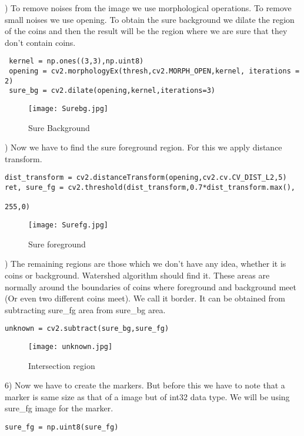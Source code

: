 \documentclass[]{article}
\begin{document}
) To remove noises from the image we use morphological operations. To remove small noises we use opening. To obtain the sure background we dilate the region of the coins and then the result will be the region where we are sure that they don’t contain coins.
\begin{verbatim}
 kernel = np.ones((3,3),np.uint8)
 opening = cv2.morphologyEx(thresh,cv2.MORPH_OPEN,kernel, iterations = 2)
 sure_bg = cv2.dilate(opening,kernel,iterations=3)
\end{verbatim}
\begin{figure}[h]
	\centering
	\texttt{[image: Surebg.jpg]}
	\caption{Sure Background}
\end{figure}
%
) Now we have to find the sure foreground region. For this we apply distance transform.
\begin{verbatim}
dist_transform = cv2.distanceTransform(opening,cv2.cv.CV_DIST_L2,5)
ret, sure_fg = cv2.threshold(dist_transform,0.7*dist_transform.max(),
                                                                  255,0)
\end{verbatim}
\begin{figure}[h]
	\centering
	\texttt{[image: Surefg.jpg]}
	\caption{Sure foreground}
\end{figure} 
) The remaining regions are those which we don’t have any idea, whether it is coins or background. Watershed algorithm should find it. These areas are normally around the boundaries of coins where foreground and background meet (Or even two different coins meet). We call it border. It can be obtained from subtracting sure\_fg area from sure\_bg area.
\begin{verbatim}
unknown = cv2.subtract(sure_bg,sure_fg)
\end{verbatim}
\begin{figure}[h]
	\centering
	\texttt{[image: unknown.jpg]}
	\caption{Intersection region}
\end{figure}

6) Now we have to create the markers. But before this we have to note that a marker is same size as that of a image but of int32 data type. We will be using sure\_fg image for the marker.
\begin{verbatim}
sure_fg = np.uint8(sure_fg)
\end{verbatim}
\end{document}
